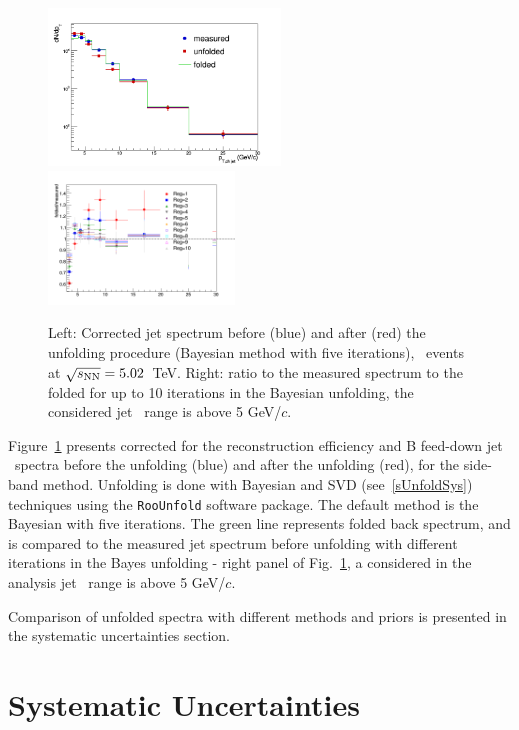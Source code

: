 \begin{figure}[bth]
\centering
\includegraphics[width=0.55\textwidth]{pPbplots/ResponseMatrix/PythiaRM__Djet5Excl_2_bayes5_weight_UnfSpectrum}
\includegraphics[width=0.44\textwidth]{pPbplots/ResponseMatrix/PythiaRM__Djet5Excl_2_bayes5_weight_foldedRatio}
\caption{Left: Corrected jet \pt spectrum before (blue) and after (red) the unfolding procedure (Bayesian method with five iterations), \pPb\ events at $\sqrt{s_{\rm NN}}=5.02$~TeV. Right: ratio to the measured spectrum to the folded for up to 10 iterations in the Bayesian unfolding, the considered jet \pt\ range is above 5 GeV/$c$.}
\label{fUnfSpec_pPb}
\end{figure}

Figure~\ref{fUnfSpec_pPb} presents corrected for the reconstruction efficiency and B feed-down jet \pt\ spectra before the unfolding (blue) and after the unfolding (red), for the side-band method.
Unfolding is done with Bayesian and SVD (see~\ref{sUnfoldSys}) techniques using the \texttt{RooUnfold} software package. The default method is the Bayesian with five iterations. The green line represents folded back spectrum, and is compared to the measured jet spectrum before unfolding with different iterations in the Bayes unfolding - right panel of Fig.~\ref{fUnfSpec_pPb}, a considered in the analysis jet \pt\ range is above 5 GeV/$c$.

Comparison of unfolded spectra with different methods and priors is presented in the systematic uncertainties section. 

\section{Systematic Uncertainties}

